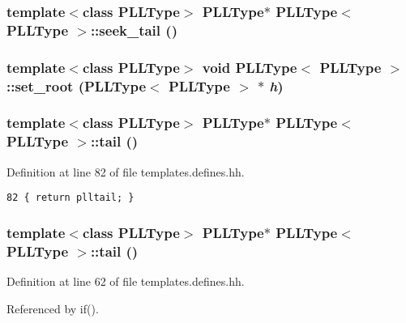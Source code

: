 \subsubsection{\setlength{\rightskip}{0pt plus 5cm}template$<$class PLLType$>$ PLLType$\ast$ PLLType$<$ PLLType $>$::seek\_\-tail ()\hspace{0.3cm}{\tt  [inline]}}\label{classPLLType_a7}


\subsubsection{\setlength{\rightskip}{0pt plus 5cm}template$<$class PLLType$>$ void PLLType$<$ PLLType $>$::set\_\-root (PLLType$<$ PLLType $>$ $\ast$ {\em h})\hspace{0.3cm}{\tt  [inline, protected]}}\label{classPLLType_b0}


\subsubsection{\setlength{\rightskip}{0pt plus 5cm}template$<$class PLLType$>$ PLLType$\ast$ PLLType$<$ PLLType $>$::tail ()\hspace{0.3cm}{\tt  [inline]}}\label{classPLLType_a14}




Definition at line 82 of file templates.defines.hh.



\footnotesize\begin{verbatim}82 { return plltail; } 
\end{verbatim}\normalsize 
{}
\subsubsection{\setlength{\rightskip}{0pt plus 5cm}template$<$class PLLType$>$ PLLType$\ast$ PLLType$<$ PLLType $>$::tail ()\hspace{0.3cm}{\tt  [inline]}}\label{classPLLType_a4}




Definition at line 62 of file templates.defines.hh.

Referenced by if().



